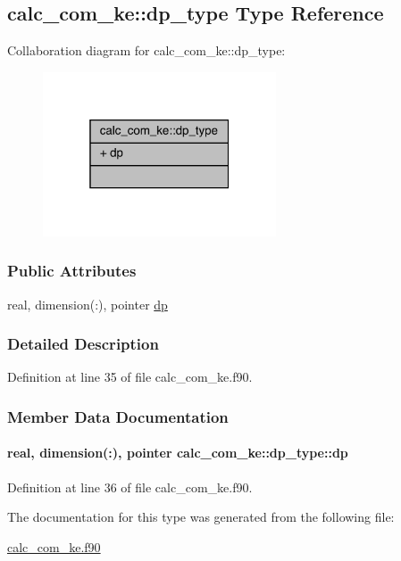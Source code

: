 \hypertarget{structcalc__com__ke_1_1dp__type}{\subsection{calc\-\_\-com\-\_\-ke\-:\-:dp\-\_\-type Type Reference}
\label{structcalc__com__ke_1_1dp__type}
}


Collaboration diagram for calc\-\_\-com\-\_\-ke\-:\-:dp\-\_\-type\-:
\nopagebreak
\begin{figure}[H]
\begin{center}
\leavevmode
\includegraphics[width=196pt]{structcalc__com__ke_1_1dp__type__coll__graph}
\end{center}
\end{figure}
\subsubsection*{Public Attributes}
\begin{DoxyCompactItemize}
\item 
real, dimension(\-:), pointer \hyperlink{structcalc__com__ke_1_1dp__type_a29a0f20b82dbdfa96e4b06410f4c70b7}{dp}
\end{DoxyCompactItemize}


\subsubsection{Detailed Description}


Definition at line 35 of file calc\-\_\-com\-\_\-ke.\-f90.



\subsubsection{Member Data Documentation}
\hypertarget{structcalc__com__ke_1_1dp__type_a29a0f20b82dbdfa96e4b06410f4c70b7}{
\paragraph[{dp}]{\setlength{\rightskip}{0pt plus 5cm}real, dimension(\-:), pointer calc\-\_\-com\-\_\-ke\-::dp\-\_\-type\-::dp}}\label{structcalc__com__ke_1_1dp__type_a29a0f20b82dbdfa96e4b06410f4c70b7}


Definition at line 36 of file calc\-\_\-com\-\_\-ke.\-f90.



The documentation for this type was generated from the following file\-:\begin{DoxyCompactItemize}
\item 
\hyperlink{calc__com__ke_8f90}{calc\-\_\-com\-\_\-ke.\-f90}\end{DoxyCompactItemize}
